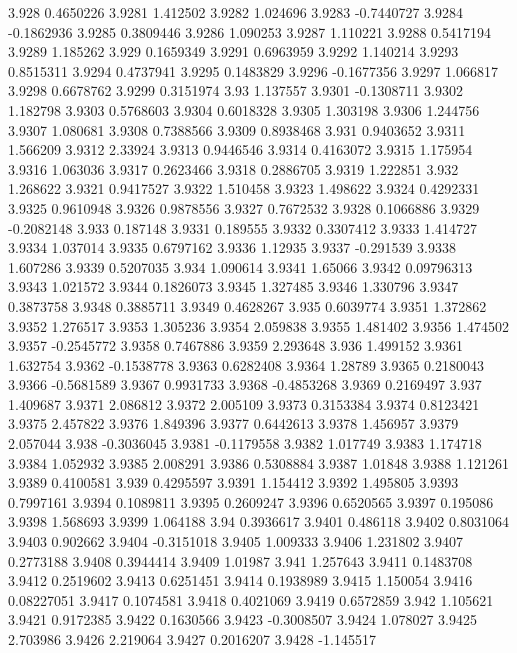 3.928  0.4650226
3.9281  1.412502
3.9282  1.024696
3.9283  -0.7440727
3.9284  -0.1862936
3.9285  0.3809446
3.9286  1.090253
3.9287  1.110221
3.9288  0.5417194
3.9289  1.185262
3.929  0.1659349
3.9291  0.6963959
3.9292  1.140214
3.9293  0.8515311
3.9294  0.4737941
3.9295  0.1483829
3.9296  -0.1677356
3.9297  1.066817
3.9298  0.6678762
3.9299  0.3151974
3.93  1.137557
3.9301  -0.1308711
3.9302  1.182798
3.9303  0.5768603
3.9304  0.6018328
3.9305  1.303198
3.9306  1.244756
3.9307  1.080681
3.9308  0.7388566
3.9309  0.8938468
3.931  0.9403652
3.9311  1.566209
3.9312  2.33924
3.9313  0.9446546
3.9314  0.4163072
3.9315  1.175954
3.9316  1.063036
3.9317  0.2623466
3.9318  0.2886705
3.9319  1.222851
3.932  1.268622
3.9321  0.9417527
3.9322  1.510458
3.9323  1.498622
3.9324  0.4292331
3.9325  0.9610948
3.9326  0.9878556
3.9327  0.7672532
3.9328  0.1066886
3.9329  -0.2082148
3.933  0.187148
3.9331  0.189555
3.9332  0.3307412
3.9333  1.414727
3.9334  1.037014
3.9335  0.6797162
3.9336  1.12935
3.9337  -0.291539
3.9338  1.607286
3.9339  0.5207035
3.934  1.090614
3.9341  1.65066
3.9342  0.09796313
3.9343  1.021572
3.9344  0.1826073
3.9345  1.327485
3.9346  1.330796
3.9347  0.3873758
3.9348  0.3885711
3.9349  0.4628267
3.935  0.6039774
3.9351  1.372862
3.9352  1.276517
3.9353  1.305236
3.9354  2.059838
3.9355  1.481402
3.9356  1.474502
3.9357  -0.2545772
3.9358  0.7467886
3.9359  2.293648
3.936  1.499152
3.9361  1.632754
3.9362  -0.1538778
3.9363  0.6282408
3.9364  1.28789
3.9365  0.2180043
3.9366  -0.5681589
3.9367  0.9931733
3.9368  -0.4853268
3.9369  0.2169497
3.937  1.409687
3.9371  2.086812
3.9372  2.005109
3.9373  0.3153384
3.9374  0.8123421
3.9375  2.457822
3.9376  1.849396
3.9377  0.6442613
3.9378  1.456957
3.9379  2.057044
3.938  -0.3036045
3.9381  -0.1179558
3.9382  1.017749
3.9383  1.174718
3.9384  1.052932
3.9385  2.008291
3.9386  0.5308884
3.9387  1.01848
3.9388  1.121261
3.9389  0.4100581
3.939  0.4295597
3.9391  1.154412
3.9392  1.495805
3.9393  0.7997161
3.9394  0.1089811
3.9395  0.2609247
3.9396  0.6520565
3.9397  0.195086
3.9398  1.568693
3.9399  1.064188
3.94  0.3936617
3.9401  0.486118
3.9402  0.8031064
3.9403  0.902662
3.9404  -0.3151018
3.9405  1.009333
3.9406  1.231802
3.9407  0.2773188
3.9408  0.3944414
3.9409  1.01987
3.941  1.257643
3.9411  0.1483708
3.9412  0.2519602
3.9413  0.6251451
3.9414  0.1938989
3.9415  1.150054
3.9416  0.08227051
3.9417  0.1074581
3.9418  0.4021069
3.9419  0.6572859
3.942  1.105621
3.9421  0.9172385
3.9422  0.1630566
3.9423  -0.3008507
3.9424  1.078027
3.9425  2.703986
3.9426  2.219064
3.9427  0.2016207
3.9428  -1.145517
